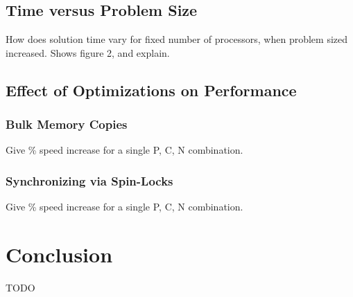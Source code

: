 \documentclass[11pt]{article} %
\begin{document}
\subsection{Time versus Problem Size}

How does solution time vary for fixed number of processors, when problem sized increased. Shows figure 2, and explain.

\subsection{Effect of Optimizations on Performance}

\subsubsection{Bulk Memory Copies}

Give \% speed increase for a single P, C, N combination.

\subsubsection{Synchronizing via Spin-Locks}

Give \% speed increase for a single P, C, N combination.

\section{Conclusion}

TODO
\end{document}
